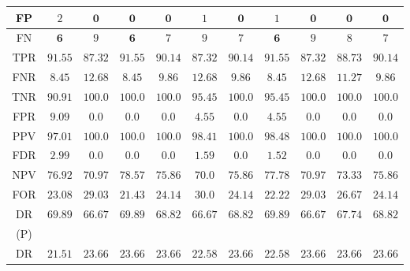 \let\LaTeXcline\cline\documentclass[sn-mathphys-num]{sn-jnl}\let\cline\LaTeXcline
\begin{document}
\begin{table}[!ht]
\begin{tabular}{|c|c|c|c|c|c|c|c|c|c|c|}
            FP & $2$ & $\mathbf{0}$ & $\mathbf{0}$ & $\mathbf{0}$ & $1$ & $\mathbf{0}$ & $1$ & $\mathbf{0}$ & $\mathbf{0}$ & $\mathbf{0}$ \\ \hline
            FN & $\mathbf{6}$ & $9$ & $\mathbf{6}$ & $7$ & $9$ & $7$ & $\mathbf{6}$ & $9$ & $8$ & $7$ \\ \hline
            TPR & $\mathbf{91.55}$ & $87.32$ & $\mathbf{91.55}$ & $90.14$ & $87.32$ & $90.14$ & $\mathbf{91.55}$ & $87.32$ & $88.73$ & $90.14$ \\ \hline
            FNR & $\mathbf{8.45}$ & $12.68$ & $\mathbf{8.45}$ & $9.86$ & $12.68$ & $9.86$ & $\mathbf{8.45}$ & $12.68$ & $11.27$ & $9.86$ \\ \hline
            TNR & $90.91$ & $\mathbf{100.0}$ & $\mathbf{100.0}$ & $\mathbf{100.0}$ & $95.45$ & $\mathbf{100.0}$ & $95.45$ & $\mathbf{100.0}$ & $\mathbf{100.0}$ & $\mathbf{100.0}$ \\ \hline
            FPR & $9.09$ & $\mathbf{0.0}$ & $\mathbf{0.0}$ & $\mathbf{0.0}$ & $4.55$ & $\mathbf{0.0}$ & $4.55$ & $\mathbf{0.0}$ & $\mathbf{0.0}$ & $\mathbf{0.0}$ \\ \hline
            PPV & $97.01$ & $\mathbf{100.0}$ & $\mathbf{100.0}$ & $\mathbf{100.0}$ & $98.41$ & $\mathbf{100.0}$ & $98.48$ & $\mathbf{100.0}$ & $\mathbf{100.0}$ & $\mathbf{100.0}$ \\ \hline
            FDR & $2.99$ & $\mathbf{0.0}$ & $\mathbf{0.0}$ & $\mathbf{0.0}$ & $1.59$ & $\mathbf{0.0}$ & $1.52$ & $\mathbf{0.0}$ & $\mathbf{0.0}$ & $\mathbf{0.0}$ \\ \hline
            NPV & $76.92$ & $70.97$ & $\mathbf{78.57}$ & $75.86$ & $70.0$ & $75.86$ & $77.78$ & $70.97$ & $73.33$ & $75.86$ \\ \hline
            FOR & $23.08$ & $29.03$ & $\mathbf{21.43}$ & $24.14$ & $30.0$ & $24.14$ & $22.22$ & $29.03$ & $26.67$ & $24.14$ \\ \hline
            DR & \multirow{2}{*}{$\mathbf{69.89}$} & \multirow{2}{*}{$66.67$} & \multirow{2}{*}{$\mathbf{69.89}$} & \multirow{2}{*}{$68.82$} & \multirow{2}{*}{$66.67$} & \multirow{2}{*}{$68.82$} & \multirow{2}{*}{$\mathbf{69.89}$} & \multirow{2}{*}{$66.67$} & \multirow{2}{*}{$67.74$} & \multirow{2}{*}{$68.82$} \\
            (P) & & & & & & & & & & \\ \hline
            DR & \multirow{2}{*}{$21.51$} & \multirow{2}{*}{$\mathbf{23.66}$} & \multirow{2}{*}{$\mathbf{23.66}$} & \multirow{2}{*}{$\mathbf{23.66}$} & \multirow{2}{*}{$22.58$} & \multirow{2}{*}{$\mathbf{23.66}$} & \multirow{2}{*}{$22.58$} & \multirow{2}{*}{$\mathbf{23.66}$} & \multirow{2}{*}{$\mathbf{23.66}$} & \multirow{2}{*}{$\mathbf{23.66}$} \\

\end{tabular}
\end{table}
\end{document}
